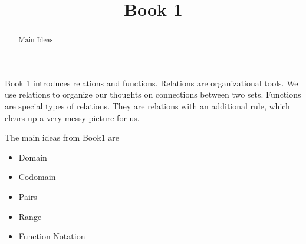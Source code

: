 \documentclass{ximera}
\title{Book 1}
\begin{document}
\begin{abstract}
Main Ideas
\end{abstract}

\maketitle

\begin{sectionOutcomes}

Book 1 introduces relations and functions. Relations are organizational tools.  We use relations to organize our thoughts on connections between two sets. Functions are special types of relations.  They are relations with an additional rule, which clears up a very messy picture for us. 

The main ideas from Book1 are

\begin{itemize}
\item Domain 
\item Codomain
\item Pairs
\item Range
\item Function Notation
\end{itemize}

\end{sectionOutcomes}
\end{document}

